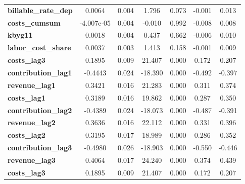 \begin{center}
\begin{tabular}{lcccccc}
\textbf{billable\_rate\_dep}              &       0.0064  &        0.004     &     1.796  &         0.073        &       -0.001    &        0.013     \\
\textbf{costs\_cumsum}                    &   -4.007e-05  &        0.004     &    -0.010  &         0.992        &       -0.008    &        0.008     \\
\textbf{kbyg11}                           &       0.0018  &        0.004     &     0.437  &         0.662        &       -0.006    &        0.010     \\
\textbf{labor\_cost\_share}               &       0.0037  &        0.003     &     1.413  &         0.158        &       -0.001    &        0.009     \\
\textbf{costs\_lag3}                      &       0.1895  &        0.009     &    21.407  &         0.000        &        0.172    &        0.207     \\
\textbf{contribution\_lag1}               &      -0.4443  &        0.024     &   -18.390  &         0.000        &       -0.492    &       -0.397     \\
\textbf{revenue\_lag1}                    &       0.3421  &        0.016     &    21.283  &         0.000        &        0.311    &        0.374     \\
\textbf{costs\_lag1}                      &       0.3189  &        0.016     &    19.862  &         0.000        &        0.287    &        0.350     \\
\textbf{contribution\_lag2}               &      -0.4389  &        0.024     &   -18.073  &         0.000        &       -0.487    &       -0.391     \\
\textbf{revenue\_lag2}                    &       0.3636  &        0.016     &    22.112  &         0.000        &        0.331    &        0.396     \\
\textbf{costs\_lag2}                      &       0.3195  &        0.017     &    18.989  &         0.000        &        0.286    &        0.352     \\
\textbf{contribution\_lag3}               &      -0.4980  &        0.026     &   -18.903  &         0.000        &       -0.550    &       -0.446     \\
\textbf{revenue\_lag3}                    &       0.4064  &        0.017     &    24.240  &         0.000        &        0.374    &        0.439     \\
\textbf{costs\_lag3}                      &       0.1895  &        0.009     &    21.407  &         0.000        &        0.172    &        0.207     \\

\end{tabular}
\end{center}
